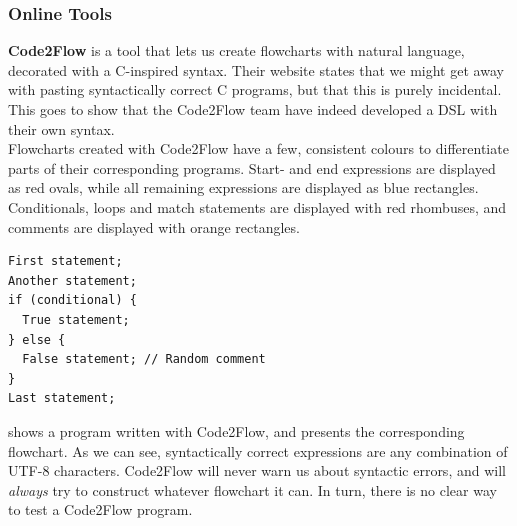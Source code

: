 \subsubsection{Online Tools}

\textbf{Code2Flow} is a tool that lets us create flowcharts with natural language, decorated with a C-inspired syntax. Their website states that we might get away with pasting syntactically correct C programs, but that this is purely incidental. This goes to show that the Code2Flow team have indeed developed a DSL with their own syntax. \\

Flowcharts created with Code2Flow have a few, consistent colours to differentiate parts of their corresponding programs. Start- and end expressions are displayed as red ovals, while all remaining expressions are displayed as blue rectangles. Conditionals, loops and match statements are displayed with red rhombuses, and comments are displayed with orange rectangles. \\

\begin{lstlisting}[caption={A Code2Flow program.}, captionpos=b, label={A Code2Flow program.}]
First statement;
Another statement;
if (conditional) {
  True statement;
} else {
  False statement; // Random comment
}
Last statement;
\end{lstlisting}

 shows a program written with Code2Flow, and  presents the corresponding flowchart. As we can see, syntactically correct expressions are any combination of UTF-8 characters. Code2Flow will never warn us about syntactic errors, and will \textit{always} try to construct whatever flowchart it can. In turn, there is no clear way to test a Code2Flow program. \\

